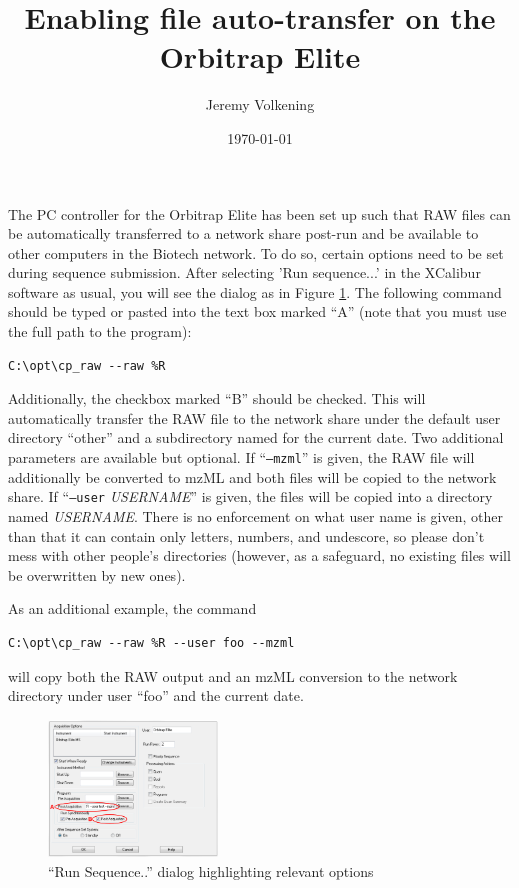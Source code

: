 \documentclass[10pt,letterpaper]{article}
\begin{document}
\title{Enabling file auto-transfer on the Orbitrap Elite}
\author{Jeremy Volkening}
\date{\today}

\maketitle

The PC controller for the Orbitrap Elite has been set up such that RAW files
can be automatically transferred to a network share post-run and be available
to other computers in the Biotech network. To do so, certain options need to
be set during sequence submission. After selecting 'Run sequence...' in the
XCalibur software as usual, you will see the dialog as in Figure
\ref{screenshot}. The following command should be typed or pasted into the
text box marked ``A'' (note that you must use the full path to the program):

\begin{Verbatim}[frame=single]
C:\opt\cp_raw --raw %R
\end{Verbatim}

Additionally, the checkbox marked ``B'' should be checked. This will
automatically transfer the RAW file to the network share under the default
user directory ``other'' and a subdirectory named for the current date. Two
additional parameters are available but optional.  If ``\texttt{--mzml}'' is
given, the RAW file will additionally be converted to mzML and both files will
be copied to the network share. If ``\texttt{--user} \textit{USERNAME}'' is
given, the files will be copied into a directory named \textit{USERNAME}.
There is no enforcement on what user name is given, other than that it can
contain only letters, numbers, and undescore, so please don't mess with other
people's directories (however, as a safeguard, no existing files will be
overwritten by new ones).

As an additional example, the command

\begin{Verbatim}[frame=single]
C:\opt\cp_raw --raw %R --user foo --mzml
\end{Verbatim}

will copy both the RAW output and an mzML conversion to the network directory
under user ``foo'' and the current date.

\begin{figure}
  \centering
  \includegraphics[width=0.4\textwidth]{screenshot}
  \caption{``Run Sequence..'' dialog highlighting relevant options}
  \label{screenshot}
\end{figure}
\end{document}
